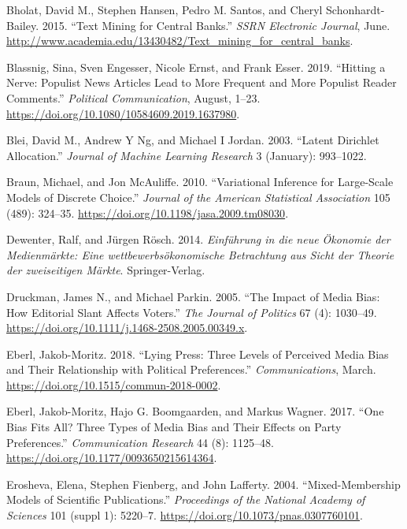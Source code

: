 \documentclass[
]{article}
\begin{document}
\hypertarget{refs}{}
\leavevmode\hypertarget{ref-bholat_text_2015}{}%
Bholat, David M., Stephen Hansen, Pedro M. Santos, and Cheryl
Schonhardt-Bailey. 2015. ``Text Mining for Central Banks.'' \emph{SSRN
Electronic Journal}, June.
\url{http://www.academia.edu/13430482/Text_mining_for_central_banks}.

\leavevmode\hypertarget{ref-blassnig_hitting_2019}{}%
Blassnig, Sina, Sven Engesser, Nicole Ernst, and Frank Esser. 2019.
``Hitting a Nerve: Populist News Articles Lead to More Frequent and More
Populist Reader Comments.'' \emph{Political Communication}, August,
1--23. \url{https://doi.org/10.1080/10584609.2019.1637980}.

\leavevmode\hypertarget{ref-blei_latent_2003}{}%
Blei, David M., Andrew Y Ng, and Michael I Jordan. 2003. ``Latent
Dirichlet Allocation.'' \emph{Journal of Machine Learning Research} 3
(January): 993--1022.

\leavevmode\hypertarget{ref-braun_variational_2010}{}%
Braun, Michael, and Jon McAuliffe. 2010. ``Variational Inference for
Large-Scale Models of Discrete Choice.'' \emph{Journal of the American
Statistical Association} 105 (489): 324--35.
\url{https://doi.org/10.1198/jasa.2009.tm08030}.

\leavevmode\hypertarget{ref-dewenter_einfuhrung_2014}{}%
Dewenter, Ralf, and Jürgen Rösch. 2014. \emph{Einführung in die neue
Ökonomie der Medienmärkte: Eine wettbewerbsökonomische Betrachtung aus
Sicht der Theorie der zweiseitigen Märkte}. Springer-Verlag.

\leavevmode\hypertarget{ref-druckman_impact_2005}{}%
Druckman, James N., and Michael Parkin. 2005. ``The Impact of Media
Bias: How Editorial Slant Affects Voters.'' \emph{The Journal of
Politics} 67 (4): 1030--49.
\url{https://doi.org/10.1111/j.1468-2508.2005.00349.x}.

\leavevmode\hypertarget{ref-eberl_lying_2018}{}%
Eberl, Jakob-Moritz. 2018. ``Lying Press: Three Levels of Perceived
Media Bias and Their Relationship with Political Preferences.''
\emph{Communications}, March.
\url{https://doi.org/10.1515/commun-2018-0002}.

\leavevmode\hypertarget{ref-eberl_one_2017}{}%
Eberl, Jakob-Moritz, Hajo G. Boomgaarden, and Markus Wagner. 2017. ``One
Bias Fits All? Three Types of Media Bias and Their Effects on Party
Preferences.'' \emph{Communication Research} 44 (8): 1125--48.
\url{https://doi.org/10.1177/0093650215614364}.

\leavevmode\hypertarget{ref-erosheva_mixed-membership_2004}{}%
Erosheva, Elena, Stephen Fienberg, and John Lafferty. 2004.
``Mixed-Membership Models of Scientific Publications.''
\emph{Proceedings of the National Academy of Sciences} 101 (suppl 1):
5220--7. \url{https://doi.org/10.1073/pnas.0307760101}.
\end{document}
